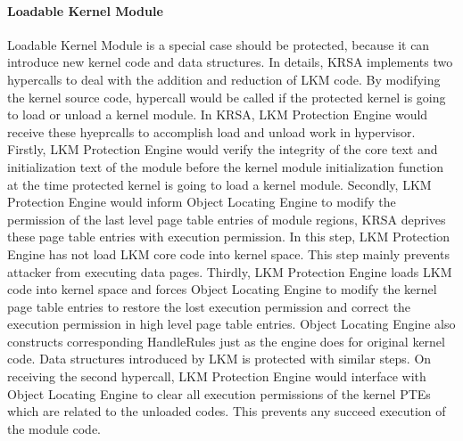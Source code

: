 \documentclass[conference]{IEEEtran}
\begin{document}
\paragraph{Loadable Kernel Module}
Loadable Kernel Module is a special case should be protected, because it can introduce new kernel code and data structures. In details, KRSA implements two hypercalls to deal with the addition and reduction of LKM code. By modifying the kernel source code, hypercall would be called if the protected kernel is going to load or unload a kernel module. In KRSA, LKM Protection Engine would receive these hyeprcalls to accomplish load and unload work in hypervisor. 
Firstly, LKM Protection Engine would verify the integrity of the core text and initialization text of the module before the kernel module initialization function at the time protected kernel is going to load a kernel module. 
Secondly, LKM Protection Engine would inform Object Locating Engine to modify the permission of the last level page table entries of module regions, KRSA deprives these page table entries with execution permission. In this step, LKM Protection Engine has not load LKM core code into kernel space. This step mainly prevents attacker from executing data pages. Thirdly, LKM Protection Engine loads LKM code into kernel space and forces Object Locating Engine to modify the kernel page table entries to restore the lost execution permission and correct the execution permission in high level page table entries. Object Locating Engine also constructs corresponding HandleRules just as the engine does for original kernel code.  
Data structures introduced by LKM is protected with similar steps. 
On receiving the second hypercall, LKM Protection Engine would interface with Object Locating Engine to clear all execution permissions of the kernel PTEs which are related to the unloaded codes. This prevents any succeed execution of the module code.

%
\end{document}
